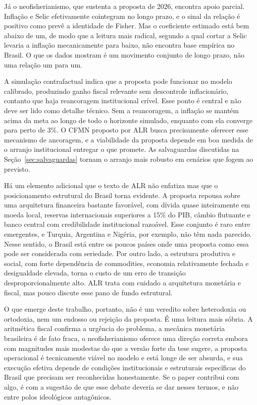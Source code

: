 \documentclass[11pt,a4paper]{article}
\begin{document}
Já o neofisherianismo, que sustenta a proposta de 2026, encontra apoio
parcial. Inflação e Selic efetivamente cointegram no longo prazo, e o
sinal da relação é positivo como prevê a identidade de Fisher. Mas o
coeficiente estimado está bem abaixo de um, de modo que a leitura mais
radical, segundo a qual cortar a Selic levaria a inflação mecanicamente
para baixo, não encontra base empírica no Brasil. O que os dados
mostram é um movimento conjunto de longo prazo, não uma relação um
para um.

A simulação contrafactual indica que a proposta pode funcionar no
modelo calibrado, produzindo ganho fiscal relevante sem descontrole
inflacionário, contanto que haja reancoragem institucional crível. Esse
ponto é central e não deve ser lido como detalhe técnico. Sem a
reancoragem, a inflação se mantém acima da meta ao longo de todo o
horizonte simulado, enquanto com ela converge para perto de 3\%. O
CFMN proposto por ALR busca precisamente oferecer esse mecanismo de
ancoragem, e a viabilidade da proposta depende em boa medida de o
arranjo institucional entregar o que promete. As salvaguardas discutidas
na Seção~\ref{sec:salvaguardas} tornam o arranjo mais robusto em
cenários que fogem ao previsto.

Há um elemento adicional que o texto de ALR não enfatiza mas que o
posicionamento estrutural do Brasil torna evidente. A proposta repousa
sobre uma arquitetura financeira bastante favorável, com dívida quase
inteiramente em moeda local, reservas internacionais superiores a 15\%
do PIB, câmbio flutuante e banco central com credibilidade institucional
razoável. Esse conjunto é raro entre emergentes, e Turquia, Argentina
e Nigéria, por exemplo, não têm nada parecido. Nesse sentido, o Brasil
está entre os poucos países onde uma proposta como essa pode ser
considerada com seriedade. Por outro lado, a estrutura produtiva e
social, com forte dependência de commodities, economia relativamente
fechada e desigualdade elevada, torna o custo de um erro de transição
desproporcionalmente alto. ALR trata com cuidado a arquitetura monetária
e fiscal, mas pouco discute esse pano de fundo estrutural.

O que emerge deste trabalho, portanto, não é um veredito sobre
heterodoxia ou ortodoxia, nem um endosso ou rejeição da proposta. É
uma leitura mais sóbria. A aritmética fiscal confirma a urgência do
problema, a mecânica monetária brasileira é de fato fraca, o
neofisherianismo oferece uma direção correta embora com magnitudes
mais modestas do que a versão forte da tese sugere, a proposta
operacional é tecnicamente viável no modelo e está longe de ser
absurda, e sua execução efetiva depende de condições institucionais
e estruturais específicas do Brasil que precisam ser reconhecidas
honestamente. Se o paper contribui com algo, é com a sugestão de
que esse debate deveria se dar nesses termos, e não entre polos
ideológicos antagônicos.
\end{document}
